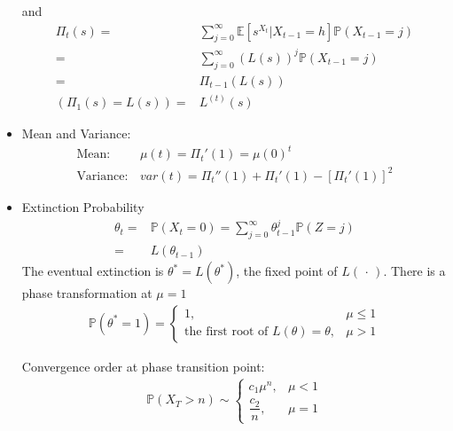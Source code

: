 \begin{itemize}[topsep=2pt,itemsep=0pt]
    and 
    \begin{align}
        \Pi_t(s)=&\sum_{j=0}^\infty \mathbb{E}\left[ s^{X_t}|X_{t-1}=h \right] \mathbb{P}\left( X_{t-1}=j \right) \\
        =&\sum_{j=0}^\infty \left(L(s)\right)^{j}\mathbb{P}\left( X_{t-1}=j \right) \\
        =&\Pi_{t-1}\left(L(s)\right)\\
        (\Pi_1(s)=L(s))=&L^{(t)}(s) 
    \end{align}
    \item Mean and Variance:
    \begin{align}
        \text{Mean}:&\, \mu (t) = \Pi_t'(1)=\mu(0) ^t\\
        \text{Variance}:&\,var(t)=\Pi_t''(1)+\Pi_t'(1)-[\Pi_t'(1)]^2
    \end{align}
    \item Extinction Probability
    \begin{align}
        \theta _t=&\mathbb{P}\left( X_t=0 \right)= \sum_{j=0}^\infty \theta ^j_{t-1}\mathbb{P}\left( Z=j \right) \\=
        &L(\theta _{t-1})
    \end{align}
    The eventual extinction is $ \theta ^*=L(\theta ^*) $, the fixed point of $ L(\, \cdot \, ) $.
    There is a phase transformation at $ \mu = 1 $
    \begin{align}
        \mathbb{P}\left( \theta ^*=1 \right) =\begin{cases}
            1,&\mu \leq 1\\
            \text{the first root of }L(\theta )=\theta ,& \mu >1
        \end{cases} 
    \end{align}
    
    Convergence order at phase transition point:
    \begin{align}
        \mathbb{P}\left( X_T>n \right) \sim \begin{cases}
            c_1\mu ^n,&\mu <1\\
            \dfrac{c_2}{n},&\mu =1
        \end{cases}  
    \end{align}
     
\end{itemize}

















